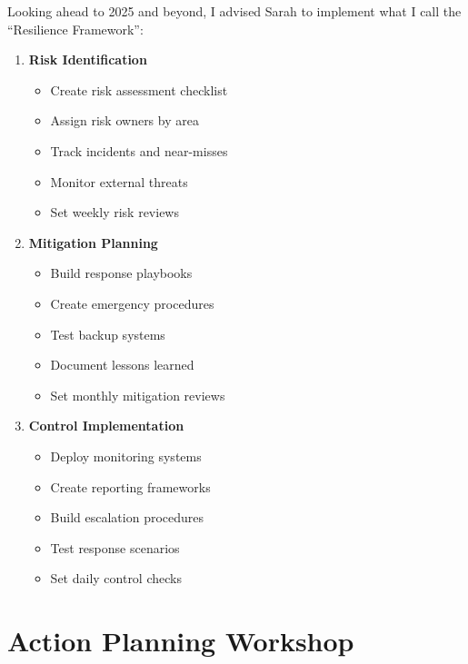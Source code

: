 Looking ahead to 2025 and beyond, I advised Sarah to implement what I call the ``Resilience Framework'':

\begin{tcolorbox}[colback=white,colframe=primarydark,title=\textbf{Risk Management Implementation}]
    \begin{enumerate}
        \item \textbf{Risk Identification}
        \begin{itemize}
            \item Create risk assessment checklist
            \item Assign risk owners by area
            \item Track incidents and near-misses
            \item Monitor external threats
            \item Set weekly risk reviews
        \end{itemize}

        \item \textbf{Mitigation Planning}
        \begin{itemize}
            \item Build response playbooks
            \item Create emergency procedures
            \item Test backup systems
            \item Document lessons learned
            \item Set monthly mitigation reviews
        \end{itemize}

        \item \textbf{Control Implementation}
        \begin{itemize}
            \item Deploy monitoring systems
            \item Create reporting frameworks
            \item Build escalation procedures
            \item Test response scenarios
            \item Set daily control checks
        \end{itemize}
    \end{enumerate}
\end{tcolorbox}

\section{Action Planning Workshop}\label{sec:action-planning-workshop-9}

